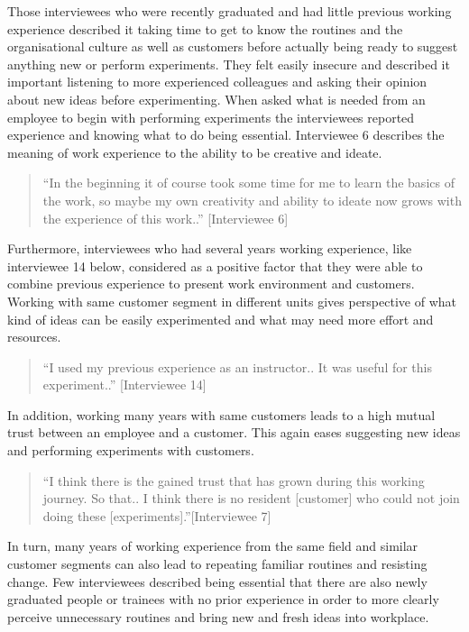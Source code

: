 Those interviewees who were recently graduated and had little previous working experience described it taking time to get to know the routines and the organisational culture as well as customers before actually being ready to suggest anything new or perform experiments. They felt easily insecure and described it important listening to more experienced colleagues and asking their opinion about new ideas before experimenting. When asked what is needed from an employee to begin with performing experiments the interviewees reported experience and knowing what to do being essential. Interviewee 6 describes the meaning of work experience to the ability to be creative and ideate. 
\begin{quote}
``In the beginning it of course took some time for me to learn the basics of the work, so maybe my own creativity and ability to ideate now grows with the experience of this work..'' [Interviewee 6]
\end{quote}
Furthermore, interviewees who had several years working experience, like interviewee 14 below, considered as a positive factor that they were able to combine previous experience to present work environment and customers. Working with same customer segment in different units gives perspective of what kind of ideas can be easily experimented and what may need more effort and resources. 
\begin{quote}
``I used my previous experience as an instructor.. It was useful for this experiment..'' [Interviewee 14]
\end{quote}
In addition, working many years with same customers leads to a high mutual trust between an employee and a customer. This again eases suggesting new ideas and performing experiments with customers. 
\begin{quote}
 ``I think there is the gained trust that has grown during this working journey. So that.. I think there is no resident [customer] who could not join doing these [experiments].''[Interviewee 7]
\end{quote}
In turn, many years of working experience from the same field and similar customer segments can also lead to repeating familiar routines and resisting change. Few interviewees described being essential that there are also newly graduated people or trainees with no prior experience in order to more clearly perceive unnecessary routines and bring new and fresh ideas into workplace. 

